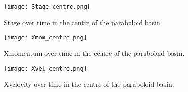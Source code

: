 \begin{figure}[h]
\begin{center}
\texttt{[image: Stage\_centre.png]}
\caption{Stage over time in the centre of the paraboloid basin.}
\label{fig:w_centre}
\end{center}
\end{figure}

\begin{figure}[h]
\begin{center}
\texttt{[image: Xmom\_centre.png]}
\caption{Xmomentum over time in the centre of the paraboloid basin.}
\label{fig:p_centre}
\end{center}
\end{figure}

\begin{figure}[h]
\begin{center}
\texttt{[image: Xvel\_centre.png]}
\caption{Xvelocity over time in the centre of the paraboloid basin.}
\label{fig:u_centre}
\end{center}
\end{figure}


\endinput

